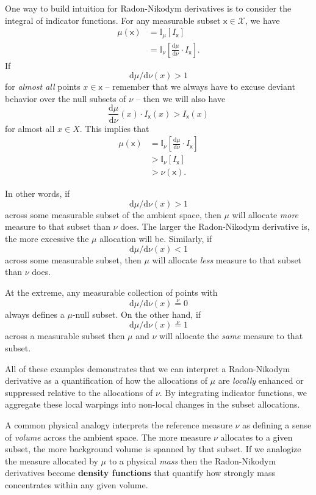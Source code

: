 \documentclass[
  letterpaper,
  DIV=11,
  numbers=noendperiod]{scrartcl}
\begin{document}
One way to build intuition for Radon-Nikodym derivatives is to consider
the integral of indicator functions. For any measurable subset
\(\mathsf{x} \in \mathcal{X}\), we have \begin{align*}
\mu( \mathsf{x} )
&=
\mathbb{I}_{\mu} [ I_{\mathsf{x}} ]
\\
&=
\mathbb{I}_{\nu} \left[
  \frac{ \mathrm{d} \mu }{ \mathrm{d} \nu } \cdot I_{\mathsf{x}}
\right].
\end{align*} If \[
\mathrm{d} \mu / \mathrm{d} \nu(x) > 1
\] for \emph{almost all} points \(x \in \mathsf{x}\) -- remember that we
always have to excuse deviant behavior over the null subsets of \(\nu\)
-- then we will also have \[
\frac{ \mathrm{d} \mu }{ \mathrm{d} \nu }(x) \cdot
I_{\mathsf{x}}(x)
> I_{\mathsf{x}}(x)
\] for almost all \(x \in X\). This implies that \begin{align*}
\mu( \mathsf{x} )
&=
\mathbb{I}_{\nu} \left[
  \frac{ \mathrm{d} \mu }{ \mathrm{d} \nu } \cdot I_{\mathsf{x}}
\right]
\\
&>
\mathbb{I}_{\nu} \left[ I_{\mathsf{x}} \right]
\\
&>
\nu(\mathsf{x}).
\end{align*}

In other words, if \[
\mathrm{d} \mu / \mathrm{d} \nu(x) > 1
\] across some measurable subset of the ambient space, then \(\mu\) will
allocate \emph{more} measure to that subset than \(\nu\) does. The
larger the Radon-Nikodym derivative is, the more excessive the \(\mu\)
allocation will be. Similarly, if \[
\mathrm{d} \mu / \mathrm{d} \nu(x) < 1
\] across some measurable subset, then \(\mu\) will allocate \emph{less}
measure to that subset than \(\nu\) does.

At the extreme, any measurable collection of points with \[
\mathrm{d} \mu / \mathrm{d} \nu(x) \overset{\nu}{=} 0
\] always defines a \(\mu\)-null subset. On the other hand, if \[
\mathrm{d} \mu / \mathrm{d} \nu(x) \overset{\nu}{=} 1
\] across a measurable subset then \(\mu\) and \(\nu\) will allocate the
\emph{same} measure to that subset.

All of these examples demonstrates that we can interpret a Radon-Nikodym
derivative as a quantification of how the allocations of \(\mu\) are
\emph{locally} enhanced or suppressed relative to the allocations of
\(\nu\). By integrating indicator functions, we aggregate these local
warpings into non-local changes in the subset allocations.

A common physical analogy interprets the reference measure \(\nu\) as
defining a sense of \emph{volume} across the ambient space. The more
measure \(\nu\) allocates to a given subset, the more background volume
is spanned by that subset. If we analogize the measure allocated by
\(\mu\) to a physical \emph{mass} then the Radon-Nikodym derivatives
become \textbf{density functions} that quantify how strongly mass
concentrates within any given volume.
\end{document}
